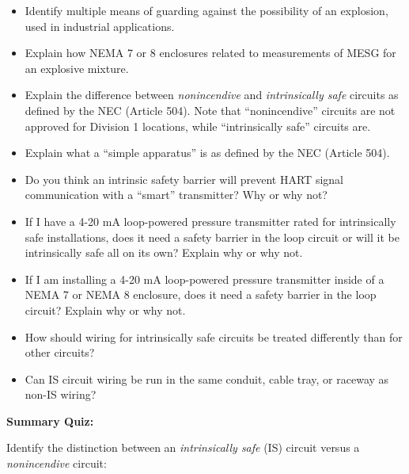 \begin{itemize}
\item{} Identify multiple means of guarding against the possibility of an explosion, used in industrial applications.
\item{} Explain how NEMA 7 or 8 enclosures related to measurements of MESG for an explosive mixture.
\item{} Explain the difference between {\it nonincendive} and {\it intrinsically safe} circuits as defined by the NEC (Article 504).  Note that ``nonincendive'' circuits are not approved for Division 1 locations, while ``intrinsically safe'' circuits are.
\item{} Explain what a ``simple apparatus'' is as defined by the NEC (Article 504).
\item{} Do you think an intrinsic safety barrier will prevent HART signal communication with a ``smart'' transmitter?  Why or why not?
\item{} If I have a 4-20 mA loop-powered pressure transmitter rated for intrinsically safe installations, does it need a safety barrier in the loop circuit or will it be intrinsically safe all on its own?  Explain why or why not.
\item{} If I am installing a 4-20 mA loop-powered pressure transmitter inside of a NEMA 7 or NEMA 8 enclosure, does it need a safety barrier in the loop circuit?  Explain why or why not.
\item{} How should wiring for intrinsically safe circuits be treated differently than for other circuits?  
\item{} Can IS circuit wiring be run in the same conduit, cable tray, or raceway as non-IS wiring?
\end{itemize}













\vfil \eject

\noindent
{\bf Summary Quiz:}

Identify the distinction between an {\it intrinsically safe} (IS) circuit versus a {\it nonincendive} circuit:

